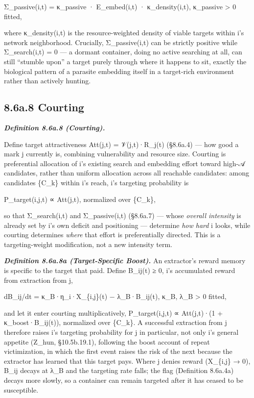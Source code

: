 \documentclass[
]{article}
\begin{document}
Σ\_passive(i,t) = κ\_passive · E\_embed(i,t) · κ\_density(i,t),
κ\_passive \textgreater{} 0 fitted,

where κ\_density(i,t) is the resource-weighted density of viable targets
within i's network neighborhood. Crucially, Σ\_passive(i,t) can be
strictly positive while Σ\_search(i,t) = 0 --- a dormant container,
doing no active searching at all, can still ``stumble upon'' a target
purely through where it happens to sit, exactly the biological pattern
of a parasite embedding itself in a target-rich environment rather than
actively hunting.

\hypertarget{a.8-courting}{%
\subsection{8.6a.8 Courting}\label{a.8-courting}}

\emph{\textbf{Definition 8.6a.8 (Courting).}}

Define target attractiveness Att(j,t) = 𝒱(j,t)·R\_j(t) (§8.6a.4) --- how
good a mark j currently is, combining vulnerability and resource size.
Courting is preferential allocation of i's existing search and embedding
effort toward high-𝒜 candidates, rather than uniform allocation across
all reachable candidates: among candidates \{C\_k\} within i's reach,
i's targeting probability is

P\_target(i,j,t) ∝ Att(j,t), normalized over \{C\_k\},

so that Σ\_search(i,t) and Σ\_passive(i,t) (§8.6a.7) --- whose
\emph{overall intensity} is already set by i's own deficit and
positioning --- determine \emph{how hard} i looks, while courting
determines \emph{where} that effort is preferentially directed. This is
a targeting-weight modification, not a new intensity term.

\emph{\textbf{Definition 8.6a.8a (Target-Specific Boost).}} An
extractor's reward memory is specific to the target that paid. Define
B\_ij(t) ≥ 0, i's accumulated reward from extraction from j,

dB\_ij/dt = κ\_B·η\_i·X\_\{i,j\}(t) − λ\_B·B\_ij(t), κ\_B, λ\_B
\textgreater{} 0 fitted,

and let it enter courting multiplicatively, P\_target(i,j,t) ∝
Att(j,t)·(1 + κ\_boost·B\_ij(t)), normalized over \{C\_k\}. A successful
extraction from j therefore raises i's targeting probability for j in
particular, not only i's general appetite (Z\_hun, §10.5b.19.1),
following the boost account of repeat victimization, in which the first
event raises the risk of the next because the extractor has learned that
this target pays. Where j denies reward (X\_\{i,j\} → 0), B\_ij decays
at λ\_B and the targeting rate falls; the flag (Definition 8.6a.4a)
decays more slowly, so a container can remain targeted after it has
ceased to be susceptible.
\end{document}
